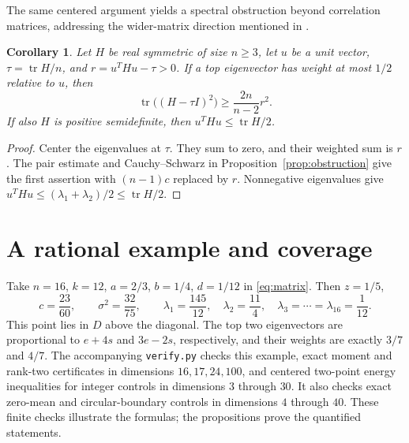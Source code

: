 \documentclass[11pt]{article}
\newtheorem{corollary}[theorem]{Corollary}
\begin{document}
The same centered argument yields a spectral obstruction beyond
correlation matrices, addressing the wider-matrix direction mentioned
in \cite[Remark IV.7 and Section VII]{SHG}.
\begin{corollary}\label{cor:symmetric}
Let $H$ be real symmetric of size $n\ge3$, let $u$ be a unit vector,
$\tau=\operatorname{tr}H/n$, and $r=u^THu-\tau>0$.
If a top eigenvector has weight at most $1/2$ relative to $u$, then
\[
 \operatorname{tr}\bigl((H-\tau I)^2\bigr)\ge\frac{2n}{n-2}r^2.
\]
If also $H$ is positive semidefinite, then
$u^THu\le\operatorname{tr}H/2$.
\end{corollary}
\begin{proof}
Center the eigenvalues at $\tau$. They sum to zero, and their
weighted sum is $r$. The pair estimate and Cauchy--Schwarz in
Proposition~\ref{prop:obstruction} give the first assertion with
$(n-1)c$ replaced by $r$. Nonnegative eigenvalues give
$u^THu\le(\lambda_1+\lambda_2)/2\le\operatorname{tr}H/2$.
\end{proof}

\section{A rational example and coverage}
Take $n=16$, $k=12$, $a=2/3$, $b=1/4$, $d=1/12$ in
\eqref{eq:matrix}. Then $z=1/5$,
\[
 c=\frac{23}{60},\qquad \sigma^2=\frac{32}{75},\qquad
 \lambda_1=\frac{145}{12},\quad\lambda_2=\frac{11}{4},\quad
 \lambda_3=\cdots=\lambda_{16}=\frac1{12}.
\]
This point lies in $D$ above the diagonal. The top two eigenvectors
are proportional to $e+4s$ and $3e-2s$, respectively, and their weights
are exactly $3/7$ and $4/7$.
The accompanying \texttt{verify.py} checks this example, exact moment
and rank-two certificates in dimensions $16,17,24,100$, and centered
two-point energy inequalities for integer controls in dimensions
$3$ through $30$. It also checks exact zero-mean and circular-boundary
controls in dimensions $4$ through $40$.
These finite checks illustrate the formulas;
the propositions prove the quantified statements.
\end{document}
